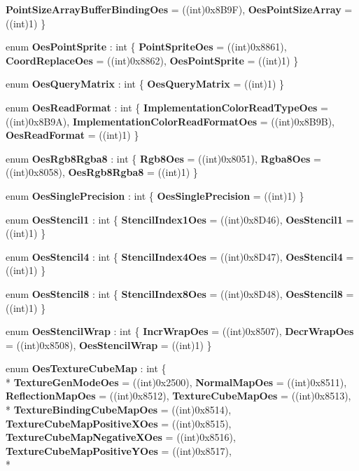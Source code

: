 \begin{DoxyCompactItemize}
{\bfseries Point\-Size\-Array\-Buffer\-Binding\-Oes} = ((int)0x8\-B9\-F), 
{\bfseries Oes\-Point\-Size\-Array} = ((int)1)
 \}
\item 
enum {\bfseries Oes\-Point\-Sprite} \-: int \{ {\bfseries Point\-Sprite\-Oes} = ((int)0x8861), 
{\bfseries Coord\-Replace\-Oes} = ((int)0x8862), 
{\bfseries Oes\-Point\-Sprite} = ((int)1)
 \}
\item 
enum {\bfseries Oes\-Query\-Matrix} \-: int \{ {\bfseries Oes\-Query\-Matrix} = ((int)1)
 \}
\item 
enum {\bfseries Oes\-Read\-Format} \-: int \{ {\bfseries Implementation\-Color\-Read\-Type\-Oes} = ((int)0x8\-B9\-A), 
{\bfseries Implementation\-Color\-Read\-Format\-Oes} = ((int)0x8\-B9\-B), 
{\bfseries Oes\-Read\-Format} = ((int)1)
 \}
\item 
enum {\bfseries Oes\-Rgb8\-Rgba8} \-: int \{ {\bfseries Rgb8\-Oes} = ((int)0x8051), 
{\bfseries Rgba8\-Oes} = ((int)0x8058), 
{\bfseries Oes\-Rgb8\-Rgba8} = ((int)1)
 \}
\item 
enum {\bfseries Oes\-Single\-Precision} \-: int \{ {\bfseries Oes\-Single\-Precision} = ((int)1)
 \}
\item 
enum {\bfseries Oes\-Stencil1} \-: int \{ {\bfseries Stencil\-Index1\-Oes} = ((int)0x8\-D46), 
{\bfseries Oes\-Stencil1} = ((int)1)
 \}
\item 
enum {\bfseries Oes\-Stencil4} \-: int \{ {\bfseries Stencil\-Index4\-Oes} = ((int)0x8\-D47), 
{\bfseries Oes\-Stencil4} = ((int)1)
 \}
\item 
enum {\bfseries Oes\-Stencil8} \-: int \{ {\bfseries Stencil\-Index8\-Oes} = ((int)0x8\-D48), 
{\bfseries Oes\-Stencil8} = ((int)1)
 \}
\item 
enum {\bfseries Oes\-Stencil\-Wrap} \-: int \{ {\bfseries Incr\-Wrap\-Oes} = ((int)0x8507), 
{\bfseries Decr\-Wrap\-Oes} = ((int)0x8508), 
{\bfseries Oes\-Stencil\-Wrap} = ((int)1)
 \}
\item 
enum {\bfseries Oes\-Texture\-Cube\-Map} \-: int \{ \\*
{\bfseries Texture\-Gen\-Mode\-Oes} = ((int)0x2500), 
{\bfseries Normal\-Map\-Oes} = ((int)0x8511), 
{\bfseries Reflection\-Map\-Oes} = ((int)0x8512), 
{\bfseries Texture\-Cube\-Map\-Oes} = ((int)0x8513), 
\\*
{\bfseries Texture\-Binding\-Cube\-Map\-Oes} = ((int)0x8514), 
{\bfseries Texture\-Cube\-Map\-Positive\-X\-Oes} = ((int)0x8515), 
{\bfseries Texture\-Cube\-Map\-Negative\-X\-Oes} = ((int)0x8516), 
{\bfseries Texture\-Cube\-Map\-Positive\-Y\-Oes} = ((int)0x8517), 
\\*

\end{DoxyCompactItemize}
